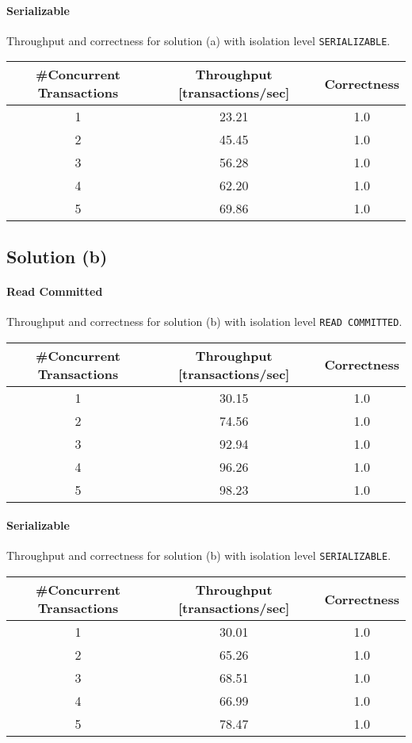 \documentclass[11pt]{scrartcl}
\begin{document}
\paragraph{Serializable}

Throughput and correctness for solution (a) with isolation level \lstinline[style=dbtsql]{SERIALIZABLE}.

\begin{table}[H]
  \centering
  \begin{tabular}{c|c|c}
    \#Concurrent Transactions & Throughput [transactions/sec] & Correctness
      \tabularnewline
    \hline
    1 & 23.21 & 1.0 \tabularnewline
    2 & 45.45 & 1.0 \tabularnewline
    3 & 56.28 & 1.0 \tabularnewline
    4 & 62.20 & 1.0 \tabularnewline
    5 & 69.86 & 1.0 \tabularnewline
  \end{tabular}
\end{table}

\subsection*{Solution (b)}

\paragraph{Read Committed}

Throughput and correctness for solution (b) with isolation level \lstinline[style=dbtsql]{READ COMMITTED}.

\begin{table}[H]
  \centering
  \begin{tabular}{c|c|c}
    \#Concurrent Transactions & Throughput [transactions/sec] & Correctness
      \tabularnewline
    \hline
    1 & 30.15 & 1.0 \tabularnewline
    2 & 74.56 & 1.0 \tabularnewline
    3 & 92.94 & 1.0 \tabularnewline
    4 & 96.26 & 1.0 \tabularnewline
    5 & 98.23 & 1.0 \tabularnewline
  \end{tabular}
\end{table}

\paragraph{Serializable}

Throughput and correctness for solution (b) with isolation level \lstinline[style=dbtsql]{SERIALIZABLE}.

\begin{table}[H]
  \centering
  \begin{tabular}{c|c|c}
    \#Concurrent Transactions & Throughput [transactions/sec] & Correctness
      \tabularnewline
    \hline
    1 & 30.01 & 1.0 \tabularnewline
    2 & 65.26 & 1.0 \tabularnewline
    3 & 68.51 & 1.0 \tabularnewline
    4 & 66.99 & 1.0 \tabularnewline
    5 & 78.47 & 1.0 \tabularnewline
  \end{tabular}
\end{table}
\end{document}
